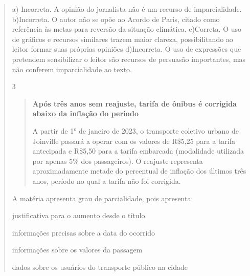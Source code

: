 \begin{quote}
{a) Incorreta. A opinião do jornalista não é um recurso de imparcialidade.
b)Incorreta. O autor não se opõe ao Acordo de Paris, citado como referência às metas
para reversão da situação climática.
c)Correta. O uso de gráficos e recursos similares trazem maior clareza, possibilitando
ao leitor formar suas próprias opiniões
d)Incorreta. O uso de expressões que pretendem sensibilizar o leitor são recursos de
persuasão importantes, mas não conferem imparcialidade ao texto.}

\num{3}

\begin{quote}

\textbf{Após três anos sem reajuste, tarifa de ônibus é corrigida abaixo da
inflação do período}

A partir de 1° de janeiro de 2023, o transporte coletivo urbano de
Joinville passará a operar com os valores de R\$5,25 para a tarifa
antecipada e R\$5,50 para a tarifa embarcada (modalidade utilizada por
apenas 5\% dos passageiros). O reajuste representa aproximadamente
metade do percentual de inflação dos últimos três anos, período no qual
a tarifa não foi corrigida.

\end{quote}


A matéria apresenta grau de parcialidade, pois apresenta:

\begin{escolha}
  
  \item justificativa para o aumento desde o título.
  
  \item informações precisas sobre a data do ocorrido
  
  \item informações sobre os valores da passagem
  
  \item dados sobre os usuários do transporte público na cidade

\end{escolha}

\end{quote}
